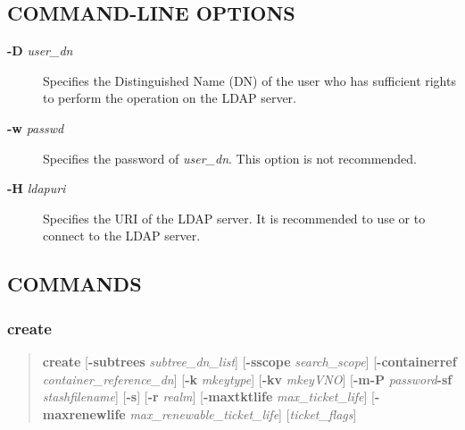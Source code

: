 \documentclass[letterpaper,10pt,english]{sphinxmanual}
\begin{document}
\subsection{COMMAND-LINE OPTIONS}
\label{admin/admin_commands/kdb5_ldap_util:command-line-options}\label{admin/admin_commands/kdb5_ldap_util:kdb5-ldap-util-options}\begin{description}
\item[{\textbf{-D} \emph{user\_dn}}] \leavevmode
Specifies the Distinguished Name (DN) of the user who has
sufficient rights to perform the operation on the LDAP server.

\item[{\textbf{-w} \emph{passwd}}] \leavevmode
Specifies the password of \emph{user\_dn}.  This option is not
recommended.

\item[{\textbf{-H} \emph{ldapuri}}] \leavevmode
Specifies the URI of the LDAP server.  It is recommended to use
 or  to connect to the LDAP server.

\end{description}


\subsection{COMMANDS}
\label{admin/admin_commands/kdb5_ldap_util:kdb5-ldap-util-options-end}\label{admin/admin_commands/kdb5_ldap_util:commands}

\subsubsection{create}
\label{admin/admin_commands/kdb5_ldap_util:create}\label{admin/admin_commands/kdb5_ldap_util:kdb5-ldap-util-create}\begin{quote}

\textbf{create}
{[}\textbf{-subtrees} \emph{subtree\_dn\_list}{]}
{[}\textbf{-sscope} \emph{search\_scope}{]}
{[}\textbf{-containerref} \emph{container\_reference\_dn}{]}
{[}\textbf{-k} \emph{mkeytype}{]}
{[}\textbf{-kv} \emph{mkeyVNO}{]}
{[}\textbf{-m\textbar{}-P} \emph{password}\textbar{}\textbf{-sf} \emph{stashfilename}{]}
{[}\textbf{-s}{]}
{[}\textbf{-r} \emph{realm}{]}
{[}\textbf{-maxtktlife} \emph{max\_ticket\_life}{]}
{[}\textbf{-maxrenewlife} \emph{max\_renewable\_ticket\_life}{]}
{[}\emph{ticket\_flags}{]}
\end{quote}
\end{document}
